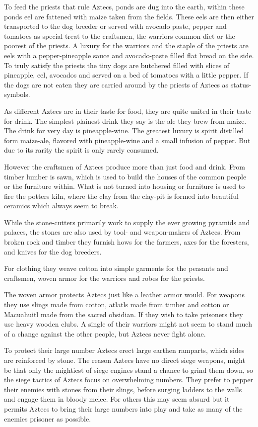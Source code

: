 \documentclass[a4paper]{article}
\begin{document}
	To feed the priests that rule \gls{Aztecs},
	ponds are dug into the earth,
	within these ponds eel are fattened with maize taken from the fields.
	These eels are then either transported to the dog breeder or
	served with avocado paste, pepper and tomatoes as special treat to the craftsmen,
	the warriors common diet or the poorest of the priests.
	A luxury for the warriors and the staple of the priests are eels with a pepper-pineapple sauce
	and avocado-paste filled flat bread on the side.
	To truly satisfy the priests the tiny dogs are butchered filled with slices of pineapple,
	eel, avocados and served on a bed of tomatoes with a little pepper.
	If the dogs are not eaten they are carried around by the priests of \gls{Aztecs}
	as status-symbols.

	As different \gls{Aztecs} are in their taste for food,
	they are quite united in their taste for drink.
	The simplest plainest drink they say is the ale they brew from maize.
	The drink for very day is pineapple-wine.
	The greatest luxury is spirit distilled form maize-ale, flavored with pineapple-wine
	and a small infusion of pepper.
	But due to its rarity the spirit is only rarely consumed.

	However the craftsmen of \gls{Aztecs} produce more than just food and drink.
	From timber lumber is sawn, which is used to build the houses of the common people
	or the furniture within.
	What is not turned into housing or furniture is used to fire the potters kiln,
	where the clay from the clay-pit is formed into beautiful ceramics which always seem to break.

	While the stone-cutters primarily work to supply the ever growing pyramids and palaces,
	the stones are also used by tool- and weapon-makers of \gls{Aztecs}.
	From broken rock and timber they furnish hows for the farmers, axes for the foresters,
	and knives for the dog breeders.

	For clothing they weave cotton into simple garments for the peasants and craftsmen,
	woven armor for the warriors and robes for the priests.

	The woven armor protects \gls{Aztecs} just like a leather armor would.
	For weapons they use slings made from cotton, atlatls made from timber and cotton
	or Macuahuitl made from the sacred obsidian.
	If they wish to take prisoners they use heavy wooden clubs.
	A single of their warriors might not seem to stand much of a change against the other people,
	but \gls{Aztecs} never fight alone.

	To protect their large number \gls{Aztecs} erect large earthen ramparts,
	which sides are reinforced by stone.
	The reason \gls{Aztecs} have no direct siege weapons,
	might be that only the mightiest of siege engines stand a chance to grind them down,
	so the siege tactics of \gls{Aztecs} focus on overwhelming numbers.
	They prefer to pepper their enemies with stones from their slings,
	before surging ladders to the walls and engage them in bloody melee.
	For others this may seem absurd but it permits \gls{Aztecs} to bring their large
	numbers into play and take as many of the enemies prisoner as possible.
\end{document}
